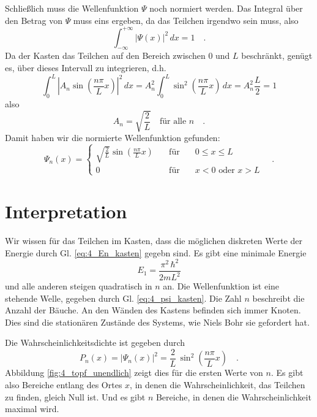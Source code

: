 Schließlich muss die Wellenfunktion $\Psi$ noch normiert werden. Das Integral über den Betrag von $\Psi$ muss eins ergeben, da das Teilchen irgendwo sein muss, also
\begin{equation}
    \int_{-\infty}^{+\infty} \left| \Psi(x) \right|^2 \,dx = 1 \quad .
\end{equation}
Da der Kasten das Teilchen auf den Bereich zwischen $0$ und $L$ beschränkt, genügt es, über dieses Intervall zu integrieren, d.h. 
\begin{equation}
    \int_0^{L} \left|  A_n \sin \left(  \frac{n\pi}{L} x \right) \right|^2 \,dx =
   A_n^2  \int_0^{L} \sin^2 \left(  \frac{n\pi}{L} x \right)  \,dx = 
   A_n^2  \frac{L}{2} = 1
\end{equation}
also
\begin{equation}
    A_n = \sqrt{\frac{2}{L}} \quad \text{für alle }n \quad .
\end{equation}
Damit haben wir die normierte Wellenfunktion gefunden:
\begin{equation}
    \Psi_n(x) = \left\{
    \begin{matrix}
        \sqrt{\frac{2}{L}}  \sin \left(  \frac{n\pi}{L} x \right) \quad &\text{für} \quad & 0 \le x \le L \\
        0  &  \text{für} &  x < 0 \text{ oder } x > L 
    \end{matrix}
    \right. \quad .
    \label{eq:4_psi_kasten}
\end{equation}

\section{Interpretation}

Wir wissen  für das Teilchen im Kasten, dass die möglichen diskreten Werte der Energie durch Gl.  \ref{eq:4_En_kasten} gegebn sind. Es gibt eine minimale Energie 
\begin{equation}
E_1 = \frac{\pi^2 \, \hbar^2}{2 m L^2}
\end{equation}
und alle anderen steigen quadratisch in $n$ an. Die Wellenfunktion ist eine stehende Welle, gegeben durch Gl. \ref{eq:4_psi_kasten}. Die Zahl $n$ beschreibt die Anzahl der Bäuche. An den Wänden des Kastens befinden sich immer Knoten.
Dies sind die stationären Zustände des Systems, wie Niels Bohr sie gefordert hat.

Die Wahrscheinlichkeitsdichte ist gegeben durch
\begin{equation}
    P_n(x) = |\Psi_n(x)|^2 = \frac{2}{L} \, \sin^2 \left(  \frac{n\pi}{L} x \right) \quad .
    \label{eq:4_WK_kasten}
\end{equation}
Abbildung  \ref{fig:4_topf_unendlich} zeigt dies für die ersten Werte von $n$. Es gibt also Bereiche entlang des Ortes $x$, in denen die Wahrscheinlichkeit, das Teilchen zu finden, gleich Null ist. Und es gibt $n$ Bereiche, in denen die Wahrscheinlichkeit maximal wird.

